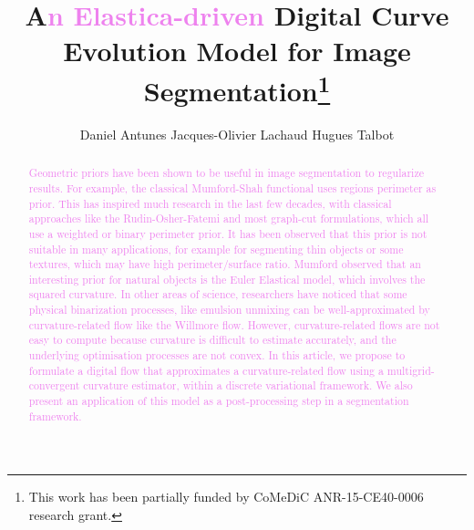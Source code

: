 \documentclass[runningheads]{llncs}
\newcommand{\HT}[1]{{\textcolor{violet}{#1}}}
\begin{document}
%
\title{A\HT{n Elastica-driven} Digital Curve Evolution Model for Image Segmentation\thanks{This  work has  been  partially  funded by CoMeDiC ANR-15-CE40-0006 research grant.}}

\author{Daniel Antunes
Jacques-Olivier Lachaud
Hugues Talbot}
%
%
%
\maketitle              %
%
\begin{abstract}
  \HT{Geometric priors have been shown to be useful in image segmentation to regularize results. For example, the classical
    Mumford-Shah functional uses regions perimeter as prior. This has inspired much research in the last few decades,
    with classical approaches like the Rudin-Osher-Fatemi and most graph-cut formulations, which all use a weighted or
    binary perimeter prior. It has been observed that this prior is not suitable in many applications, for example for
    segmenting thin objects or some textures, which may have high perimeter/surface ratio. Mumford observed that an
    interesting prior for natural objects is the Euler Elastical model, which involves the squared curvature. In other
    areas of science, researchers have noticed that some physical binarization processes, like emulsion unmixing can be
    well-approximated by curvature-related flow like the Willmore flow. 
    However, curvature-related flows are not easy to compute because curvature is difficult to estimate accurately, and the
    underlying optimisation processes are not convex. In this article, we propose to formulate a digital flow that
    approximates a curvature-related flow using a multigrid-convergent curvature estimator, within a discrete
    variational framework. We also present an application of this model as a post-processing step in a segmentation
    framework.}
\end{abstract}
%
%
%
\setcounter{footnote}{0}
\end{document}
